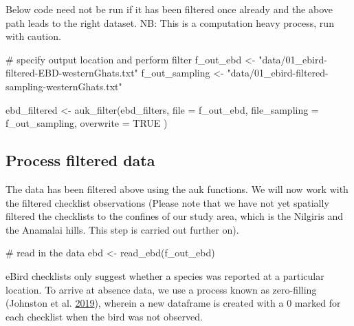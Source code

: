 \documentclass[
]{article}
\newenvironment{Shaded}{}{}
\newcommand{\CommentTok}[1]{\textcolor[rgb]{0.00,0.50,0.00}{#1}}
\newcommand{\DataTypeTok}[1]{#1}
\newcommand{\KeywordTok}[1]{\textcolor[rgb]{0.00,0.00,1.00}{#1}}
\newcommand{\NormalTok}[1]{#1}
\newcommand{\OtherTok}[1]{\textcolor[rgb]{1.00,0.25,0.00}{#1}}
\newcommand{\StringTok}[1]{\textcolor[rgb]{0.00,0.50,0.50}{#1}}
\begin{document}
Below code need not be run if it has been filtered once already and the above path leads to the right dataset. NB: This is a computation heavy process, run with caution.

\begin{Shaded}
\begin{Highlighting}[]
\CommentTok{# specify output location and perform filter}
\NormalTok{f_out_ebd <-}\StringTok{ "data/01_ebird-filtered-EBD-westernGhats.txt"}
\NormalTok{f_out_sampling <-}\StringTok{ "data/01_ebird-filtered-sampling-westernGhats.txt"}
\end{Highlighting}
\end{Shaded}

\begin{Shaded}
\begin{Highlighting}[]
\NormalTok{ebd_filtered <-}\StringTok{ }\KeywordTok{auk_filter}\NormalTok{(ebd_filters,}
  \DataTypeTok{file =}\NormalTok{ f_out_ebd,}
  \DataTypeTok{file_sampling =}\NormalTok{ f_out_sampling, }\DataTypeTok{overwrite =} \OtherTok{TRUE}
\NormalTok{)}
\end{Highlighting}
\end{Shaded}

\hypertarget{process-filtered-data}{%
\subsection{Process filtered data}\label{process-filtered-data}}

The data has been filtered above using the auk functions. We will now work with the filtered checklist observations (Please note that we have not yet spatially filtered the checklists to the confines of our study area, which is the Nilgiris and the Anamalai hills. This step is carried out further on).

\begin{Shaded}
\begin{Highlighting}[]
\CommentTok{# read in the data}
\NormalTok{ebd <-}\StringTok{ }\KeywordTok{read_ebd}\NormalTok{(f_out_ebd)}
\end{Highlighting}
\end{Shaded}

eBird checklists only suggest whether a species was reported at a particular location. To arrive at absence data, we use a process known as zero-filling (Johnston et al. \protect\hyperlink{ref-johnston2019a}{2019}), wherein a new dataframe is created with a 0 marked for each checklist when the bird was not observed.
\end{document}
